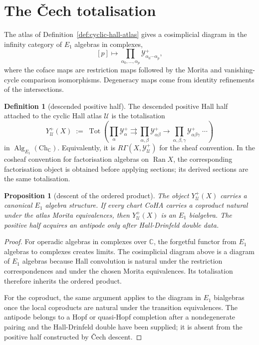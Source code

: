 \documentclass[11pt]{article}
\providecommand{\CC}{\mathbb{C}}
\providecommand{\cU}{\mathcal{U}}
\providecommand{\cY}{\mathcal{Y}}
\providecommand{\Ran}{\operatorname{Ran}}
\providecommand{\Tot}{\operatorname{Tot}}
\providecommand{\Alg}{\operatorname{Alg}}
\newtheorem{proposition}[theorem]{Proposition}
\theoremstyle{definition}
\newtheorem{definition}[theorem]{Definition}
\theoremstyle{remark}
\begin{document}
\section{The \v{C}ech totalisation}

The atlas of Definition~\ref{def:cyclic-hall-atlas} gives a cosimplicial
diagram in the infinity category of $E_1$ algebras in complexes,
\[
[p]\longmapsto
\prod_{\alpha_0,\ldots,\alpha_p}
\cY^+_{\alpha_0\cdots\alpha_p},
\]
where the coface maps are restriction maps followed by the Morita and
vanishing-cycle comparison isomorphisms. Degeneracy maps come from
identity refinements of the intersections.

\begin{definition}[descended positive half]\label{def:descended-positive-half}
The descended positive Hall half attached to the cyclic Hall atlas
$\cU$ is the totalisation
\[
Y^+_{\cU}(X)
\;:=\;
\Tot\!\left(
\prod_{\alpha}\cY^+_{\alpha}
\rightrightarrows
\prod_{\alpha,\beta}\cY^+_{\alpha\beta}
\longrightarrow
\prod_{\alpha,\beta,\gamma}\cY^+_{\alpha\beta\gamma}
\;\cdots
\right)
\]
in $\Alg_{E_1}(\mathrm{Ch}_{\CC})$. Equivalently, it is
$R\Gamma(X,\cY^+_{\cU})$ for the sheaf convention. In the cosheaf
convention for factorisation algebras on $\Ran X$, the corresponding
factorisation object is obtained before applying sections; its derived
sections are the same totalisation.
\end{definition}

\begin{proposition}[descent of the ordered product]\label{prop:ordered-product-descent}
The object $Y^+_{\cU}(X)$ carries a canonical $E_1$ algebra structure.
If every chart CoHA carries a coproduct natural under the atlas Morita
equivalences, then $Y^+_{\cU}(X)$ is an $E_1$ bialgebra. The positive
half acquires an antipode only after Hall-Drinfeld double data.
\end{proposition}

\begin{proof}
For operadic algebras in complexes over $\CC$, the forgetful functor
from $E_1$ algebras to complexes creates limits. The cosimplicial
diagram above is a diagram of $E_1$ algebras because Hall convolution is
natural under the restriction correspondences and under the chosen
Morita equivalences. Its totalisation therefore inherits the ordered
product.

For the coproduct, the same argument applies to the diagram in
$E_1$ bialgebras once the local coproducts are natural under the
transition equivalences. The antipode belongs to a Hopf or quasi-Hopf
completion after a nondegenerate pairing and the Hall-Drinfeld double
have been supplied; it is absent from the positive half constructed by
\v{C}ech descent.
\end{proof}
\end{document}
